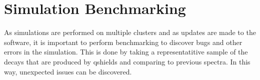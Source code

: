 \section{Simulation Benchmarking}

As simulations are performed on multiple clusters and as updates are made to the software, it is important to perform benchmarking to discover bugs and other errors in the simulation.
This is done by taking a representatitive sample of the decays that are produced by qshields and comparing to previous spectra.
In this way, unexpected issues can be discovered.